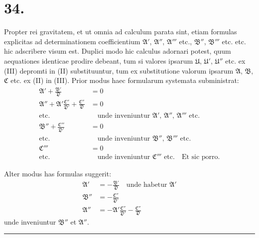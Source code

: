 \documentclass[12pt,a4paper]{book}
\begin{document}
\section*{34.}
\label{sec:art34}

Propter rei gravitatem, et ut omnia ad calculum parata sint, etiam formulas explicitas ad determinationem coefficientium $\mathfrak{A}'$, $\mathfrak{A}''$, $\mathfrak{A}'''$ etc., $\mathfrak{B}''$, $\mathfrak{B}'''$ etc. etc. hic adscribere visum est. Duplici modo hic calculus adornari potest, quum aequationes identicae prodire debeant, tum si valores ipsarum $\mathfrak{U}$, $\mathfrak{U}'$, $\mathfrak{U}''$ etc. ex (III) depromti in (II) substituuntur, tum ex substitutione valorum ipsarum $\mathfrak{A}$, $\mathfrak{B}$, $\mathfrak{C}$ etc. ex (II) in (III). Prior modus haec formularum systemata subministrat:
%
\begin{align*}
\mathfrak{A}'+\frac{\mathfrak{B}'}{\mathfrak{D}}&=0\\
\mathfrak{A}''+\mathfrak{A}'\frac{\mathfrak{C}''}{\mathfrak{D}'}+\frac{\mathfrak{C}''}{\mathfrak{D}}&=0\\
\text{etc.} &\quad\text{unde inveniuntur }\mathfrak{A}',\,\mathfrak{A}'',\,\mathfrak{A}'''\text{ etc.}\\
\mathfrak{B}''+\frac{\mathfrak{C}'''}{\mathfrak{D}'}&=0\\
\text{etc.} &\quad\text{unde inveniuntur }\mathfrak{B}'',\,\mathfrak{B}'''\text{ etc.}\\
\mathfrak{C}'''&=0\\
\text{etc.} &\quad\text{unde inveniuntur }\mathfrak{C}'''\text{ etc.}\quad\text{Et sic porro.}
\end{align*}

Alter modus has formulas suggerit:
%
\begin{align*}
\mathfrak{A}'&=-\frac{\mathfrak{B}'}{\mathfrak{D}}\quad\text{unde habetur }\mathfrak{A}'\\
\mathfrak{B}''&=-\frac{\mathfrak{C}''}{\mathfrak{D}'}\\
\mathfrak{A}''&=-\mathfrak{A}'\frac{\mathfrak{C}''}{\mathfrak{D}'}-\frac{\mathfrak{C}''}{\mathfrak{D}}
\end{align*}
unde inveniuntur $\mathfrak{B}''$ et $\mathfrak{A}''$.

\vspace{2em}
\begin{center}
\rule{0.5\textwidth}{0.4pt}
\end{center}
\end{document}
